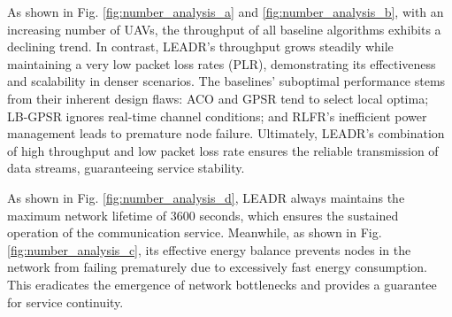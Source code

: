 \documentclass[runningheads]{llncs}
\begin{document}

As shown in Fig. \ref{fig:number_analysis_a} and \ref{fig:number_analysis_b}, with an increasing number of UAVs, the throughput of all baseline algorithms exhibits a declining trend. In contrast, LEADR's throughput grows steadily while maintaining a very low packet loss rates (PLR), demonstrating its effectiveness and scalability in denser scenarios. The baselines' suboptimal performance stems from their inherent design flaws: ACO and GPSR tend to select local optima; LB-GPSR ignores real-time channel conditions; and RLFR's inefficient power management leads to premature node failure. Ultimately, LEADR’s combination of high throughput and low packet loss rate ensures the reliable transmission of data streams, guaranteeing service stability.

As shown in Fig. \ref{fig:number_analysis_d}, LEADR always maintains the maximum network lifetime of 3600 seconds, which ensures the sustained operation of the communication service. Meanwhile, as shown in Fig. \ref{fig:number_analysis_c}, its effective energy balance prevents nodes in the network from failing prematurely due to excessively fast energy consumption. This eradicates the emergence of network bottlenecks and provides a guarantee for service continuity.
\end{document}
